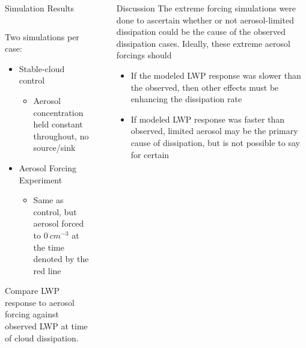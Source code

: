 \documentclass[final]{beamer}
\newlength{\sepwid}
\newlength{\onecolwid}
\newlength{\twocolwid}
\begin{document}
\begin{frame}[t]
\begin{columns}[t]
\begin{column}{\twocolwid}
\begin{alertblock}{Simulation Results}
\begin{column}{0.39\linewidth}
			Two simulations per case:
			\begin{itemize}
				\item Stable-cloud control
				\begin{itemize}
					\item Aerosol concentration held constant throughout, no source/sink
				\end{itemize}
				\item Aerosol Forcing Experiment
				\begin{itemize}
					\item Same as control, but aerosol forced to $0\ cm^{-3}$ at the time denoted by the red line
				\end{itemize}
			\end{itemize}
			\vspace{0.1em}
			Compare LWP response to aerosol forcing against observed LWP at time of cloud dissipation.

		\end{column}
	\end{alertblock}
\end{column}



\begin{column}{\sepwid}\end{column}

\begin{column}{\onecolwid}
	\begin{block}{Discussion}
		The extreme forcing simulations were done to ascertain whether or not aerosol-limited dissipation could be the cause of the observed dissipation cases. Ideally, these extreme aerosol forcings should

		\begin{itemize}
			\item If the modeled LWP response was slower than the observed, then other effects must be enhancing the dissipation rate
			\item If modeled LWP response was faster than observed, limited aerosol may be the primary cause of dissipation, but is not possible to say for certain
		\end{itemize}
		

\end{block}
\end{column}
\end{columns}
\end{frame}
\end{document}
